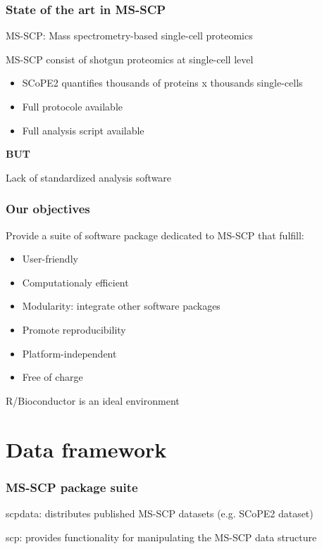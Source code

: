 \documentclass{beamer}
\newcommand{\frametitlesection}[1]{\frametitle{\centering #1 \footnotesize \hspace{0pt plus 1 filll} \insertsection}}
\begin{document}
\begin{frame}
    \frametitlesection{State of the art in MS-SCP}

    MS-SCP: Mass spectrometry-based single-cell proteomics 
    
    MS-SCP consist of shotgun proteomics at single-cell level 
    
    \begin{itemize}
        \item{SCoPE2 quantifies thousands of proteins x thousands single-cells}
        \item{Full protocole available}
        \item{Full analysis script available}
    \end{itemize}
    
    \textbf{BUT}
    
    Lack of standardized analysis software
\end{frame}

\begin{frame}
    \frametitlesection{Our objectives}

    Provide a suite of software package dedicated to MS-SCP that fulfill:

    \begin{itemize}
        \item{User-friendly}
        \item{Computationaly efficient}
        \item{Modularity: integrate other software packages}
        \item{Promote reproducibility}
        \item{Platform-independent}
        \item{Free of charge}
    \end{itemize}
    
    R/Bioconductor is an ideal environment
    
\end{frame}



\section{Data framework}


\begin{frame}
    \frametitlesection{MS-SCP package suite}
    
    scpdata: distributes published MS-SCP datasets (e.g. SCoPE2 dataset)
    
    scp: provides functionality for manipulating the MS-SCP data structure

\end{frame}
\end{document}
